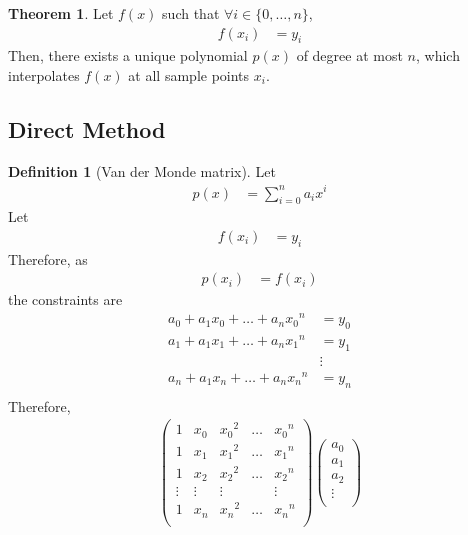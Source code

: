 \documentclass[fleqn, a4paper, 12pt, twoside]{article}
\theoremstyle{definition}
\newtheorem{definition}{Definition}
\theoremstyle{theorem}
\newtheorem{theorem}{Theorem}
\begin{document}
\begin{theorem}
	Let $f(x)$ such that $\forall i \in \{0,\dots,n\}$,
	\begin{align*}
		f(x_i) & = y_i
	\end{align*}
	Then, there exists a unique polynomial $p(x)$ of degree at most $n$, which interpolates $f(x)$ at all sample points $x_i$.
\end{theorem}

\subsection{Direct Method}

\begin{definition}[Van der Monde matrix]
	Let
	\begin{align*}
		p(x) & = \sum\limits_{i = 0}^{n} a_i x^i
	\end{align*}
	Let
	\begin{align*}
		f(x_i) & = y_i
	\end{align*}
	Therefore, as
	\begin{align*}
		p(x_i) & = f(x_i)
	\end{align*}
	the constraints are
	\begin{align*}
		a_0 + a_1 x_0 + \dots + a_n {x_0}^n & = y_0  \\
		a_1 + a_1 x_1 + \dots + a_n {x_1}^n & = y_1  \\
                                                    & \vdots \\
		a_n + a_1 x_n + \dots + a_n {x_n}^n & = y_n  \\
	\end{align*}
	Therefore,
	\begin{align*}
			\begin{pmatrix}
				1      & x_0    & {x_0}^2 & \dots & {x_0}^n \\
				1      & x_1    & {x_1}^2 & \dots & {x_1}^n \\
				1      & x_2    & {x_2}^2 & \dots & {x_2}^n \\
				\vdots & \vdots & \vdots  &       & \vdots  \\
				1      & x_n    & {x_n}^2 & \dots & {x_n}^n \\
			\end{pmatrix}
			\begin{pmatrix}
				a_0    \\
				a_1    \\
				a_2    \\
				\vdots \\

\end{pmatrix}
\end{align*}
\end{definition}
\end{document}
